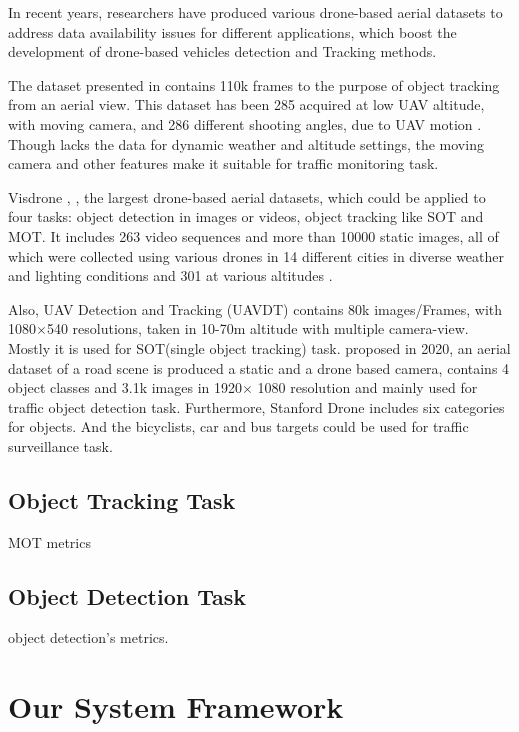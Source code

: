 \documentclass[10pt,twocolumn,letterpaper]{article}  %
\begin{document}
In recent years, researchers have produced various drone-based aerial datasets to address data availability issues for different applications, which boost the development of drone-based vehicles detection and Tracking methods.\cite{bisio2022systematic}

The dataset presented in \cite{mueller2016benchmark} contains 110k frames to the purpose of object tracking from an aerial view. This dataset has been 285
acquired at low UAV altitude, with moving camera, and 286
different shooting angles, due to UAV motion \cite{bisio2022systematic}. Though \cite{mueller2016benchmark} lacks the data for dynamic weather and altitude settings, the moving camera and other features make it suitable for traffic monitoring task.

Visdrone \cite{zhu2021detection}, \cite{zhu2018vision}, the largest drone-based aerial datasets, which could be applied to four tasks: object detection in images or videos, object tracking like SOT and MOT. It includes 263 video sequences and more than 10000 static images, all of which were collected using various drones in 14 different cities in diverse weather and lighting conditions and 301
at various altitudes \cite{bisio2022systematic}.

Also, UAV Detection and Tracking (UAVDT) \cite{du2018unmanned} contains 80k images/Frames, with 1080$\times$540  resolutions, taken in 10-70m altitude with multiple camera-view. Mostly it is used for SOT(single object tracking) task. \cite{jensen2020presenting} proposed in 2020, an aerial dataset of a road scene is produced a static and a drone based camera, contains 4 object classes and 3.1k images in 1920$\times$ 1080 resolution and mainly used for traffic object detection task. Furthermore, Stanford Drone \cite{robicquet2016learning} includes six categories for objects. And the bicyclists, car and bus targets could be used for traffic surveillance task. 


\subsection{Object Tracking Task}
MOT metrics

\subsection{Object Detection Task}
object detection's metrics.



\section{Our System Framework}
\end{document}
